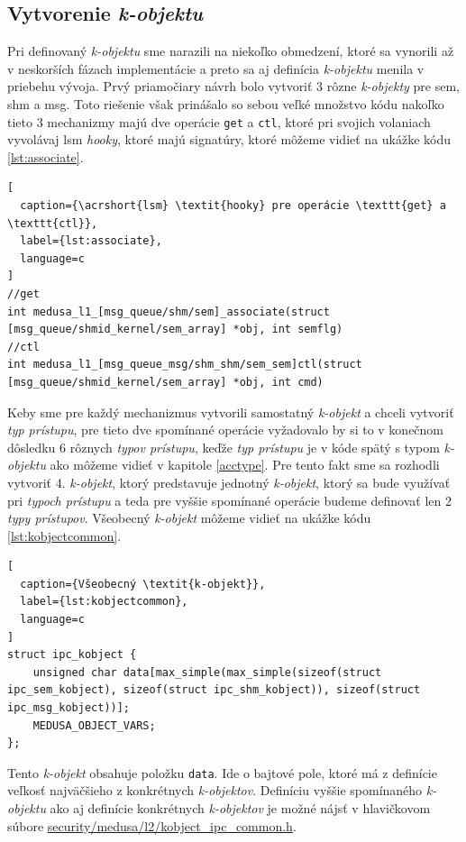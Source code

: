 \subsection{Vytvorenie \textit{k-objektu}} \label{kobjectimpl}
Pri definovaný \textit{k-objektu} sme narazili na niekoľko obmedzení, ktoré sa vynorili až v neskorších fázach implementácie a preto sa aj definícia \textit{k-objektu} menila v priebehu vývoja. Prvý priamočiary návrh bolo vytvoriť 3 rôzne \textit{k-objekty} pre \acrshort{sem}, \acrshort{shm} a \acrshort{msg}. Toto riešenie však prinášalo so sebou veľké množstvo kódu nakoľko tieto 3 mechanizmy majú dve operácie \texttt{get} a \texttt{ctl}, ktoré pri svojich volaniach vyvolávaj \acrshort{lsm} \textit{hooky}, ktoré majú signatúry, ktoré môžeme vidieť na ukážke kódu \ref{lst:associate}.
\begin{lstlisting}[
  caption={\acrshort{lsm} \textit{hooky} pre operácie \texttt{get} a \texttt{ctl}},
  label={lst:associate},
  language=c
]
//get
int medusa_l1_[msg_queue/shm/sem]_associate(struct [msg_queue/shmid_kernel/sem_array] *obj, int semflg)
//ctl
int medusa_l1_[msg_queue_msg/shm_shm/sem_sem]ctl(struct [msg_queue/shmid_kernel/sem_array] *obj, int cmd)
\end{lstlisting} 
Keby sme pre každý mechanizmus vytvorili samostatný \textit{k-objekt} a chceli vytvoriť \textit{typ prístupu}, pre tieto dve spomínané operácie vyžadovalo by si to v konečnom dôsledku 6 rôznych \textit{typov prístupu}, keďže \textit{typ prístupu} je v kóde spätý s typom \textit{k-objektu} ako môžeme vidieť v kapitole \ref{acctype}. 
Pre tento fakt sme sa rozhodli vytvoriť 4. \textit{k-objekt}, ktorý predstavuje jednotný \textit{k-objekt}, ktorý sa bude využívať pri \textit{typoch prístupu} a teda pre vyššie spomínané operácie budeme definovať len 2 \textit{typy prístupov}. Všeobecný \textit{k-objekt} môžeme vidieť na ukážke kódu \ref{lst:kobjectcommon}. 
\begin{lstlisting}[
  caption={Všeobecný \textit{k-objekt}},
  label={lst:kobjectcommon},
  language=c
]
struct ipc_kobject {	
	unsigned char data[max_simple(max_simple(sizeof(struct ipc_sem_kobject), sizeof(struct ipc_shm_kobject)), sizeof(struct ipc_msg_kobject))];	
	MEDUSA_OBJECT_VARS;
};
\end{lstlisting} 
Tento \textit{k-objekt} obsahuje položku \texttt{data}. Ide o bajtové pole, ktoré má z definície veľkosť najväčšieho z konkrétnych \textit{k-objektov}. Definíciu vyššie spomínaného \textit{k-objektu} ako aj definície konkrétnych \textit{k-objektov} je možné nájsť v hlavičkovom súbore \url{security/medusa/l2/kobject_ipc_common.h}. 

